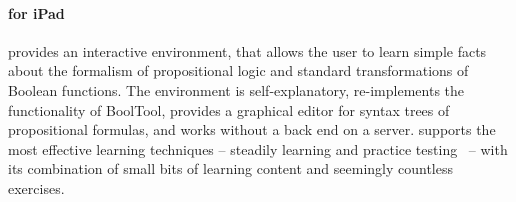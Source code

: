 \paragraph{\Nyaya for iPad} provides an interactive environment,
that allows the user to learn simple facts about the formalism of propositional logic 
and standard transformations of Boolean functions. 
The environment is self-explanatory, re-implements the functionality of  BoolTool,
provides a graphical editor for syntax trees of propositional formulas, and 
works without a back end on a server.
\Nyaya supports the most effective learning techniques – 
steadily learning and practice testing\ \cite{Dunlosky01012013} –
with its combination 
of small bits of learning content and seemingly countless exercises. 


%

